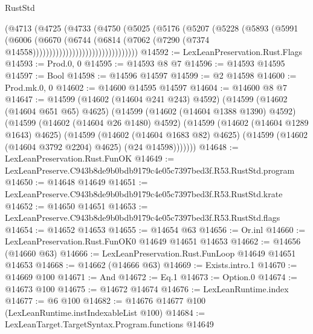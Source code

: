 \begin{lexlean}{RustStd}
\begin{coremodule}
                                  (@4713
                                    (@4725
                                      (@4733
                                        (@4750
                                          (@5025
                                            (@5176
                                              (@5207
                                                (@5228
                                                  (@5893
                                                    (@5991
                                                      (@6006
                                                        (@6670
                                                          (@6744
                                                            (@6814
                                                              (@7062
                                                                (@7290
                                                                  (@7374
                                                                    @14558))))))))))))))))))))))))))))))))
@14592 := LexLeanPreservation.Rust.Flags
@14593 := Prod.{0, 0}
@14595 := @14593 @8 @7
@14596 := @14593 @14595
@14597 := Bool
@14598 := @14596 @14597
@14599 := @2 @14598
@14600 := Prod.mk.{0, 0}
@14602 := @14600 @14595 @14597
@14604 := @14600 @8 @7
@14647 := @14599
    (@14602 (@14604 @241 @243) @4592)
    (@14599
      (@14602 (@14604 @651 @65) @4625)
      (@14599
        (@14602 (@14604 @1388 @1390) @4592)
        (@14599
          (@14602 (@14604 @26 @1480) @4592)
          (@14599
            (@14602 (@14604 @1289 @1643) @4625)
            (@14599
              (@14602 (@14604 @1683 @82) @4625)
              (@14599 (@14602 (@14604 @3792 @2204) @4625) (@24 @14598)))))))
@14648 := LexLeanPreservation.Rust.FunOK
@14649 := LexLeanPreserve.C943b8de9b0bdb9179c4e05c7397bed3f.R53.RustStd.program
@14650 := @14648 @14649
@14651 := LexLeanPreserve.C943b8de9b0bdb9179c4e05c7397bed3f.R53.RustStd.krate
@14652 := @14650 @14651
@14653 := LexLeanPreserve.C943b8de9b0bdb9179c4e05c7397bed3f.R53.RustStd.flags
@14654 := @14652 @14653
@14655 := @14654 @63
@14656 := Or.inl
@14660 := LexLeanPreservation.Rust.FunOK0 @14649 @14651 @14653
@14662 := @14656 (@14660 @63)
@14666 := LexLeanPreservation.Rust.FunLoop @14649 @14651 @14653
@14668 := @14662 (@14666 @63)
@14669 := Exists.intro.{1}
@14670 := @14669 @100
@14671 := And
@14672 := Eq.{1}
@14673 := Option.{0}
@14674 := @14673 @100
@14675 := @14672 @14674
@14676 := LexLeanRuntime.index
@14677 := @6 @100
@14682 := @14676 @14677 @100 (LexLeanRuntime.instIndexableList @100)
@14684 := LexLeanTarget.TargetSyntax.Program.functions @14649

\end{coremodule}
\end{lexlean}
